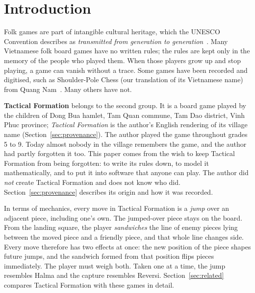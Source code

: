 \section{Introduction}
\label{sec:intro}

Folk games are part of intangible cultural heritage, which the UNESCO
Convention describes as \emph{transmitted from generation to
generation}~\citep{unesco2003ich}. Many Vietnamese folk board games have no
written rules; the rules are kept only in the memory of the people who
played them. When those players grow up and stop playing, a game can vanish
without a trace. Some games have been recorded
and digitised, such as Shoulder-Pole Chess (our translation of its Vietnamese name) from
Quang Nam~\citep{mytour_coganh}. Many
others have not.

\textbf{Tactical Formation} belongs to the second group. It is a board game
played by the children of Dong Bua hamlet, Tam Quan commune, Tam Dao
district, Vinh Phuc province; \emph{Tactical Formation} is the author's
English rendering of its village name (Section~\ref{sec:provenance}). The
author played the game throughout grades 5 to 9. Today almost nobody in the village remembers
the game, and the author had partly forgotten it too. This paper comes from
the wish to keep Tactical Formation from being forgotten: to write its rules down, to
model it mathematically, and to put it into software that anyone can play.
The author did \emph{not} create Tactical Formation and does not know who did.
Section~\ref{sec:provenance} describes its origin and how it was recorded.

In terms of mechanics, every move in Tactical Formation is a \emph{jump} over an
adjacent piece, including one's own. The jumped-over piece stays on the
board. From the landing square, the player \emph{sandwiches} the line of
enemy pieces lying between the moved piece and a friendly piece, and that
whole line changes side. Every move therefore has two effects at once: the
new position of the piece shapes future jumps, and the sandwich formed from
that position flips pieces immediately. The player must weigh both. Taken
one at a time, the jump resembles Halma and the capture resembles Reversi.
Section~\ref{sec:related} compares Tactical Formation with these games in detail.

